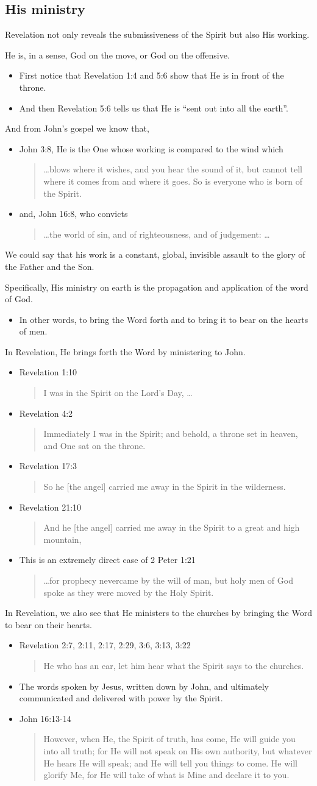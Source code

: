 \documentclass[12pt]{article}
\newcommand{\BI}{\begin{itemize}}
\newcommand{\EI}{\end{itemize}}
\newcommand{\I}{\item}
\newcommand{\Q}[1]{\begin{quote} #1 \end{quote}}
\begin{document}
\subsection{His ministry}
\I  Revelation not only reveals the submissiveness of the Spirit
    but also His working.
\I  He is, in a sense, God on the move, or God on the offensive.
\BI \I  First notice that Revelation 1:4 and 5:6 show 
        that He is in front of the throne.
    \I  And then Revelation 5:6 tells us that He is ``sent out into all the earth''.
    \EI
\I  And from John's gospel we know that,
\BI \I  John 3:8, He is the One whose working is compared to the wind which
        \Q{ \ldots blows where it wishes, and you hear the sound of it,
            but cannot tell where it comes from and where it goes.
            So is everyone who is born of the Spirit.}
    \I  and, John 16:8, who convicts
        \Q{\ldots the world of sin, and of righteousness, and of judgement: \ldots}
    \EI
\I  We could say that his work is a constant, global, invisible assault 
    to the glory of the Father and the Son.
\I  Specifically, His ministry on earth is the propagation and application
    of the word of God.
\BI \I  In other words, to bring the Word forth and 
        to bring it to bear on the hearts of men. \EI
\I  In Revelation, He brings forth the Word by ministering to John.
\BI \I  Revelation 1:10 \Q{I was in the Spirit on the Lord's Day, \dots}
    \I  Revelation 4:2 \Q{Immediately I was in the Spirit; and behold,
                        a throne set in heaven, and One sat on the throne.}
    \I  Revelation 17:3 \Q{So he [the angel] carried me away in the Spirit
                        in the wilderness.}
    \I  Revelation 21:10 \Q{And he [the angel] carried me away in the Spirit to 
                            a great and high mountain,} 
    \I  This is an extremely direct case of 2 Peter 1:21
        \Q{ \ldots for prophecy nevercame by the will of man,
            but holy men of God spoke as they were moved by the Holy Spirit.} \EI
\I  In Revelation, we also see that He ministers to the churches by bringing
    the Word to bear on their hearts.
\BI \I  Revelation 2:7, 2:11, 2:17, 2:29, 3:6, 3:13, 3:22
        \Q{He who has an ear, let him hear what the Spirit says to the churches.}
    \I  The words spoken by Jesus, written down by John, and
        ultimately communicated and delivered with power by the Spirit. 
    \I  John 16:13-14
        \Q{However, when He, the Spirit of truth, has come,
            He will guide you into all truth;
            for He will not speak on His own authority,
            but whatever He hears He will speak;
            and He will tell you things to come.
            He will glorify Me,
            for He will take of what is Mine and declare it to you.} \EI
        
\end{document}
